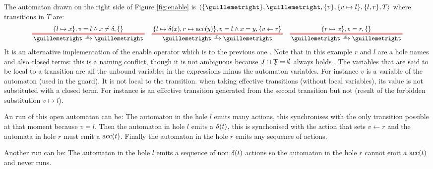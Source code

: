 \documentclass{article}
\begin{document}
\begin{exi}
The automaton drawn on the right side of Figure \ref{fig:enable} is \(\OA{\mbrc{»}}{»}{\mbrc{v}}{\mbrc{v \mapsto l}}{\mbrc{l, r}}{T}\) where transitions in \(T\) are:
\begin{align*}
	\OT{»}{»}{x}{\mbrc{l \mapsto x}}{v = l \wedge x \neq \delta}{\mbrc{}} &&
	\OT{»}{»}{\tau}{\mbrc{l \mapsto \delta\mpar{x}, r \mapsto \act{acc}\mpar{y}}}{v = l \wedge x = y}{\mbrc{v \gets r}} &&
	\OT{»}{»}{x}{\mbrc{r \mapsto x}}{v = r}{\mbrc{}}
\end{align*}
It is an alternative implementation of the enable operator which is  to the previous one \cite{henrio:01299562}. 
Note that in this example \(r\) and \(l\) are a hole names and also closed terms: this is a naming conflict, though it is not ambiguous because \(J \cap {\mathcal{T}}_{\!\!\emptyset} = \emptyset\) always holds . 
The variables that are said to be local to a transition are all the unbound variables in the expressions minus the automaton variables.
For instance \(v\) is a variable of the automaton (used in the guard).
It is not local to the transition.
  when taking effective transitions (without local variables), its value is not substituted with a closed term.
For instance  is an effective transition generated from the second transition but not  (result of the forbidden substitution \(v \mapsto l\)).

An  run of this open automaton can be: The automaton in the hole \(l\) emits many actions, this synchronises with the only transition possible at that moment because \(v = l\).
Then the automaton in hole \(l\) emits a \(\delta{\left(t\right)}\), this is synchonised with the action that sets \(v \gets r\) and the automata in hole \(r\) must emit a \(\mathrm{acc}{\left(t\right)}\).
Finally the automaton in the hole \(r\) emits any sequence of actions.

Another  run can be: The automaton in the hole \(l\) emits a sequence of non \(\delta{\left(t\right)}\) actions so the automaton in the hole \(r\) cannot emit a \(\mathrm{acc}{\left(t\right)}\) and never runs.
\end{exi}
\end{document}
